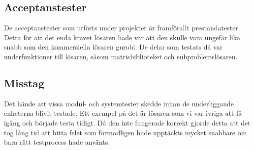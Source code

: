 	
	\subsection{Acceptanstester}
	De acceptanstester som utförts under projektet är framförallt prestandatester. Detta för att det enda kravet lösaren hade var att den skulle vara ungefär lika snabb som den kommersiella lösaren gurobi. De delar som testats då var underfunktioner till lösaren, såsom matrisbiblioteket och subproblemslösaren.
	
	\subsection{Misstag}
	Det hände att vissa modul- och systemtester skedde innan de underliggande enheterna blivit testade. Ett exempel på det är lösaren som vi var ivriga att få igång och började testa tidigt. Då den inte fungerade korrekt gjorde detta att det tog lång tid att hitta felet som förmodligen hade upptäckts mycket snabbare om bara rätt testprocess hade använts.